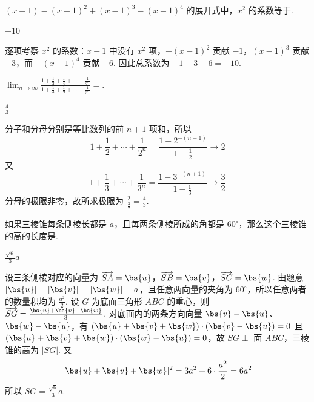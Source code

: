 \begin{problem}
\((x-1)-(x-1)^2+(x-1)^3-(x-1)^4\) 的展开式中，\(x^2\) 的系数等于\fillinblank{}.
\end{problem}

\begin{answer}
\(-10\)
\end{answer}

\begin{solution}
逐项考察 \(x^2\) 的系数：\(x-1\) 中没有 \(x^2\) 项，\(-(x-1)^2\) 贡献 \(-1\)，\((x-1)^3\) 贡献 \(-3\)，而 \(-(x-1)^4\) 贡献 \(-6\). 因此总系数为 \(-1-3-6=-10\).
\end{solution}

\begin{problem}
\(\displaystyle\lim_{n\to\infty}\frac{1+\frac{1}{2}+\frac{1}{4}+\cdots+\frac{1}{2^n}}{1+\frac{1}{3}+\frac{1}{9}+\cdots+\frac{1}{3^n}}=\)\fillinblank{}.
\end{problem}

\begin{answer}
\(\frac{4}{3}\)
\end{answer}

\begin{solution}
分子和分母分别是等比数列的前 \(n+1\) 项和，所以
\[
1+\frac12+\cdots+\frac1{2^n}=\frac{1-2^{-(n+1)}}{1-\frac12}\longrightarrow2
\]
又
\[
1+\frac13+\cdots+\frac1{3^n}=\frac{1-3^{-(n+1)}}{1-\frac13}\longrightarrow\frac32
\]
分母的极限非零，故所求极限为 \(\frac{2}{\frac{3}{2}}=\frac43\).
\end{solution}

\begin{problem}
如果三棱锥每条侧棱长都是 \(a\)，且每两条侧棱所成的角都是 \(60^\circ\)，那么这个三棱锥的高的长度是\fillinblank{}.
\end{problem}

\begin{answer}
\(\frac{\sqrt{6}}{3}a\)
\end{answer}

\begin{solution}
设三条侧棱对应的向量为 \(\overrightarrow{SA}=\bs{u}\)，\(\overrightarrow{SB}=\bs{v}\)，\(\overrightarrow{SC}=\bs{w}\). 由题意 \(|\bs{u}|=|\bs{v}|=|\bs{w}|=a\)，且任意两向量的夹角为 \(60^\circ\)，所以任意两者的数量积均为 \(\frac{a^2}{2}\). 设 \(G\) 为底面三角形 \(ABC\) 的重心，则 \(\overrightarrow{SG}=\frac{\bs{u}+\bs{v}+\bs{w}}{3}\). 对底面内的两条方向向量 \(\bs{v}-\bs{u}\)、\(\bs{w}-\bs{u}\)，有 \((\bs{u}+\bs{v}+\bs{w})\cdot(\bs{v}-\bs{u})=0\) 且 \((\bs{u}+\bs{v}+\bs{w})\cdot(\bs{w}-\bs{u})=0\)，故 \(SG\perp\) 面 \(ABC\)，三棱锥的高为 \(|SG|\). 又
\[
|\bs{u}+\bs{v}+\bs{w}|^2=3a^2+6\cdot\frac{a^2}{2}=6a^2
\]
所以 \(SG=\frac{\sqrt6}{3}a\).
\end{solution}


